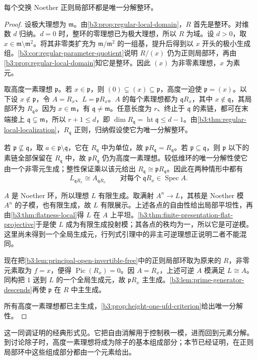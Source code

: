 \begin{theorem}\label{b3:thm:regular-local-ufd}
	每个交换 Noether 正则局部环都是唯一分解整环。
\end{theorem}
\begin{proof}
	设极大理想为 \(\mathfrak m\)。由\cref{b3:prop:regular-local-domain}，\(R\) 首先是整环。对维数 \(d\) 归纳。\(d=0\) 时，整环的零理想已为极大理想，所以 \(R\) 为域。设 \(d>0\)，取 \(x\in\mathfrak m\setminus\mathfrak m^2\)。将其非零类扩充为 \(\mathfrak m/\mathfrak m^2\) 的一组基，提升后得到以 \(x\) 开头的极小生成组。\cref{b3:cor:regular-parameter-quotient}说明 \(R/(x)\) 仍为正则局部环，再由\cref{b3:prop:regular-local-domain}知它是整环。因此 \((x)\) 为非零素理想，\(x\) 为素元。

	取高度一素理想 \(\mathfrak p\)。若 \(x\in\mathfrak p\)，则 \((0)\subsetneq(x)\subseteq\mathfrak p\)，高度一迫使 \(\mathfrak p=(x)\)。以下设 \(x\notin\mathfrak p\)，令 \(A=R_x\)、\(L=\mathfrak pR_x\)。\(A\) 的每个素理想都为 \(\mathfrak qR_x\)，其中 \(x\notin\mathfrak q\)，其局部环为 \(R_{\mathfrak q}\)。因为 \(x\in\mathfrak m\)，有 \(\mathfrak q\ne\mathfrak m\)。任意长度为 \(r\)、终止于 \(\mathfrak q\) 的素链，都可在末端接上 \(\mathfrak q\subsetneq\mathfrak m\)，所以 \(r+1\le d\)，即 \(\dim R_{\mathfrak q}=\operatorname{ht}\mathfrak q\le d-1\)。由\cref{b3:thm:regular-local-localization}，\(R_{\mathfrak q}\) 正则，归纳假设使它为唯一分解整环。

	若 \(\mathfrak p\nsubseteq\mathfrak q\)，取 \(a\in\mathfrak p\setminus\mathfrak q\)，它在 \(R_{\mathfrak q}\) 中为单位，故 \(\mathfrak pR_{\mathfrak q}=R_{\mathfrak q}\)。若 \(\mathfrak p\subseteq\mathfrak q\)，则 \(\mathfrak p\) 以下的素链全部保留在 \(R_{\mathfrak q}\) 中，故 \(\mathfrak pR_{\mathfrak q}\) 仍为高度一素理想。较低维环的唯一分解性使它由一个非零元生成；整性保证乘以该元给出 \(R_{\mathfrak q}\cong\mathfrak pR_{\mathfrak q}\)。因此在两种情形中都有
	\[
		L_{\mathfrak qR_x} \cong A_{\mathfrak qR_x} \qquad\text{对每个}\;\mathfrak qR_x\in\operatorname{Spec}A.
	\]

	\(A\) 是 Noether 环，所以理想 \(L\) 有限生成。取满射 \(A^n\to L\)，其核是 Noether 模 \(A^n\) 的子模，也有限生成，故 \(L\) 有限展示。上述各点的自由性给出局部平坦性，再由\cref{b3:thm:flatness-local}得 \(L\) 在 \(A\) 上平坦。\cref{b3:thm:finite-presentation-flat-projective}于是使 \(L\) 成为有限生成投射模；其各点的秩均为一，所以它是可逆模。这里尚未得到一个全局生成元，行列式引理中的非主可逆理想正说明二者不能混同。

	现在把\cref{b3:lem:principal-open-invertible-free}中的正则局部环取为原来的 \(R\)，非零元素取为 \(f=x\)，便得 \(\operatorname{Pic}(R_x)=0\)。因 \(A=R_x\)，上述可逆 \(A\) 模满足 \(L\cong A\)。同构把 \(1\) 送到 \(L\) 的一个全局生成元，故 \(\mathfrak pR_x\) 主生成。\cref{b3:lem:prime-generator-descends}再使 \(\mathfrak p\) 在 \(R\) 中主生成。

	所有高度一素理想都已主生成，\cref{b3:prop:height-one-ufd-criterion}给出唯一分解性。
\end{proof}

这一同调证明的经典形式见\cite[Theorem 20.3, pp. 163--164]{Matsumura1989CommutativeRingTheory}。它把自由消解用于控制秩一模，进而回到元素分解。到讨论除子时，高度一素理想将成为除子的基本组成部分；本节已经证明，在正则局部环中这些组成部分都由一个元素给出。
